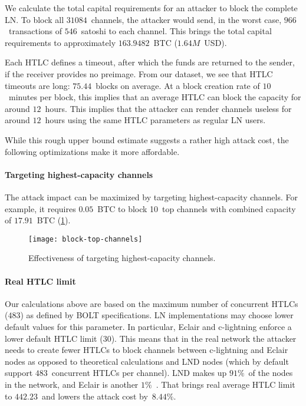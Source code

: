 We calculate the total capital requirements for an attacker to block the complete LN.
To block all $31084$~channels, the attacker would send, in the worst case, $966$~transactions of $546$~satoshi to each channel.
This brings the total capital requirements to approximately $163.9482$~BTC ($1.64M$~USD).

Each HTLC defines a timeout, after which the funds are returned to the sender, if the receiver provides no preimage.
From our dataset, we see that HTLC timeouts are long: $75.44$~blocks on average.
At a block creation rate of $10$~minutes per block, this implies that an average HTLC can block the capacity for around $12$~hours.
This implies that the attacker can render channels useless for around $12$~hours using the same HTLC parameters as regular LN users.

While this rough upper bound estimate suggests a rather high attack cost, the following optimizations make it more affordable.


\paragraph{Targeting highest-capacity channels}
The attack impact can be maximized by targeting highest-capacity channels.
For example, it requires $0.05$~BTC to block 10~top channels with combined capacity of $17.91$~BTC (\cref{fig:block-top-channels}).

\begin{figure}[tb]
	\centering
	\texttt{[image: block-top-channels]}
	\caption{Effectiveness of targeting highest-capacity channels.\label{fig:block-top-channels}}
\end{figure}

\paragraph{Real HTLC limit}
Our calculations above are based on the maximum number of concurrent HTLCs ($483$) as defined by BOLT specifications.
LN implementations may choose lower default values for this parameter.
In particular, Eclair and c-lightning enforce a lower default HTLC limit ($30$).
This means that in the real network the attacker needs to create fewer HTLCs to block channels between c-lightning and Eclair nodes as opposed to theoretical calculations and LND nodes (which by default support $483$~concurrent HTLCs per channel).
LND makes up $91\%$~of the nodes in the network, and Eclair is another $1\%$~\cite{Mizrahi2020}.
That brings real average HTLC limit to $442.23$~and lowers the attack cost by~$8.44\%$.

